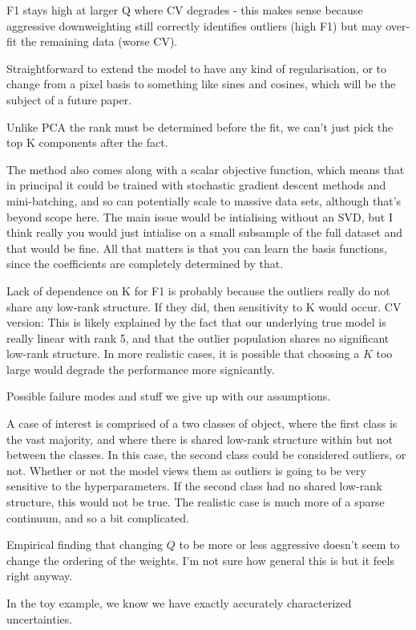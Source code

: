 \documentclass[onecolumn,floatfix]{aastex631}
\begin{document}
F1 stays high at larger Q where CV degrades - this makes sense because aggressive downweighting still correctly identifies outliers  
  (high F1) but may over-fit the remaining data (worse CV).

Straightforward to extend the model to have any kind of regularisation, or to change from a pixel basis to something like sines and cosines, which will be the subject of a future paper.

Unlike PCA the rank must be determined before the fit, we can't just pick the top K components after the fact.

The method also comes along with a scalar objective function, which means that in principal it could be trained with stochastic gradient descent methods and mini-batching, and so can potentially scale to massive data sets, although that's beyond scope here.
The main issue would be intialising without an SVD, but I think really you would just intialise on a small subsample of the full dataset and that would be fine.
All that matters is that you can learn the basis functions, since the coefficients are completely determined by that.

Lack of dependence on K for F1 is probably because the outliers really do not share any low-rank structure.
If they did, then sensitivity to K would occur.
CV version: This is likely explained by the fact that our underlying true model is really linear with rank 5, and that the outlier population shares no significant low-rank structure.
In more realistic cases, it is possible that choosing a $K$ too large would degrade the performance more signicantly.

Possible failure modes and stuff we give up with our assumptions.

A case of interest is comprised of a two classes of object, where the first class is the vast majority, and where there is shared low-rank structure within but not between the classes.
In this case, the second class could be considered outliers, or not.
Whether or not the model views them as outliers is going to be very sensitive to the hyperparameters.
If the second class had no shared low-rank structure, this would not be true.
The realistic case is much more of a sparse continuum, and so a bit complicated.

Empirical finding that changing $Q$ to be more or less aggressive doesn't seem to change the ordering of the weights.
I'm not sure how general this is but it feels right anyway.

In the toy example, we know we have exactly accurately characterized uncertainties.
\end{document}
